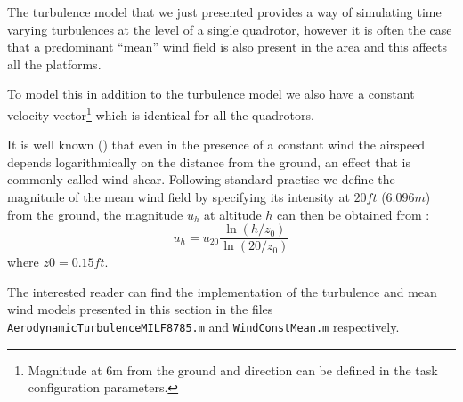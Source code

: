 \documentclass[a4paper,11pt]{report}
\begin{document}
The turbulence model that we just presented provides a way of simulating time varying turbulences at the level of a single quadrotor, however it is often the case that a predominant ``mean'' wind field is also present in the area and this affects all the platforms. 

To model this in addition to the turbulence model we also have a constant velocity vector\footnote{Magnitude at 6m from the ground and direction can be defined in the task configuration parameters.} which is identical for all the quadrotors. 

It is well known (\cite{milf8785c}) that even in the presence of a constant wind the airspeed depends logarithmically on the distance from the ground, an effect that is commonly called wind shear.
Following standard practise we define the magnitude of the mean wind field by specifying its intensity at $20ft$ ($6.096m$) from the ground, the magnitude $u_h$ at altitude $h$ can then be obtained from :
\begin{equation}
u_h = u_{20} \frac{\ln(h/z_0)}{\ln(20/z_0)}
\end{equation}
where $z0=0.15ft$.

The interested reader can find the implementation of the turbulence and mean wind models presented in this section in the files \texttt{AerodynamicTurbulenceMILF8785.m} and \texttt{WindConstMean.m} respectively.  



\end{document}
